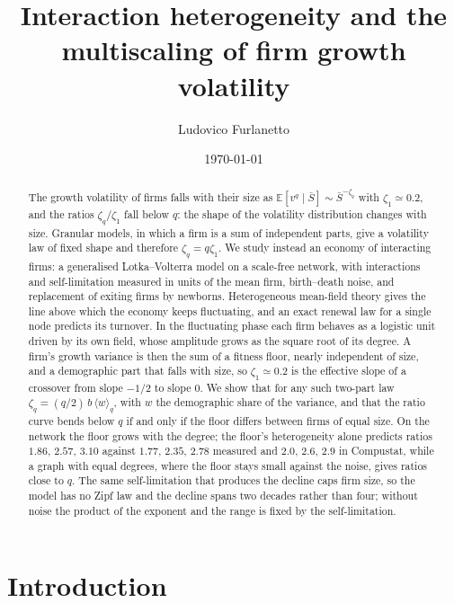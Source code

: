 \documentclass[pre,twocolumn,superscriptaddress,nofootinbib]{revtex4-2}
\newcommand{\E}{\mathbb E}
\newcommand{\Sb}{\bar S}
\begin{document}
\title{Interaction heterogeneity and the multiscaling of firm growth volatility}
\author{Ludovico Furlanetto}
\date{\today}

\begin{abstract}
The growth volatility of firms falls with their size as $\E[v^q\mid\Sb]\sim\Sb^{-\zeta_q}$ with
$\zeta_1\simeq0.2$, and the ratios $\zeta_q/\zeta_1$ fall below $q$: the shape of the volatility
distribution changes with size.  Granular models, in which a firm is a sum of independent parts,
give a volatility law of fixed shape and therefore $\zeta_q=q\zeta_1$.  We study instead an economy of
interacting firms: a generalised Lotka--Volterra model on a scale-free network, with interactions
and self-limitation measured in units of the mean firm, birth--death noise, and replacement of
exiting firms by newborns.  Heterogeneous mean-field theory gives the line above which the economy
keeps fluctuating, and an exact renewal law for a single node predicts its turnover.  In the
fluctuating phase each firm behaves as a logistic unit driven by its own field, whose amplitude
grows as the square root of its degree.  A firm's growth variance is then the sum of a fitness floor,
nearly independent of size, and a demographic part that falls with size, so $\zeta_1\simeq0.2$ is the
effective slope of a crossover from slope $-1/2$ to slope $0$.  We show that for any such two-part law
$\zeta_q=(q/2)\,b\,\langle w\rangle_q$, with $w$ the demographic share of the variance, and that the ratio
curve bends below $q$ if and only if the floor differs between firms of equal size.  On the network
the floor grows with the degree; the floor's heterogeneity alone predicts ratios $1.86$, $2.57$, $3.10$
against $1.77$, $2.35$, $2.78$ measured and $2.0$, $2.6$, $2.9$ in Compustat, while a graph with equal
degrees, where the floor stays small against the noise, gives ratios close to $q$.  The same self-limitation that produces the decline caps firm size, so the model
has no Zipf law and the decline spans two decades rather than four; without noise the product of the
exponent and the range is fixed by the self-limitation.
\end{abstract}

\maketitle

\section{Introduction}
\label{sec:intro}
\end{document}
